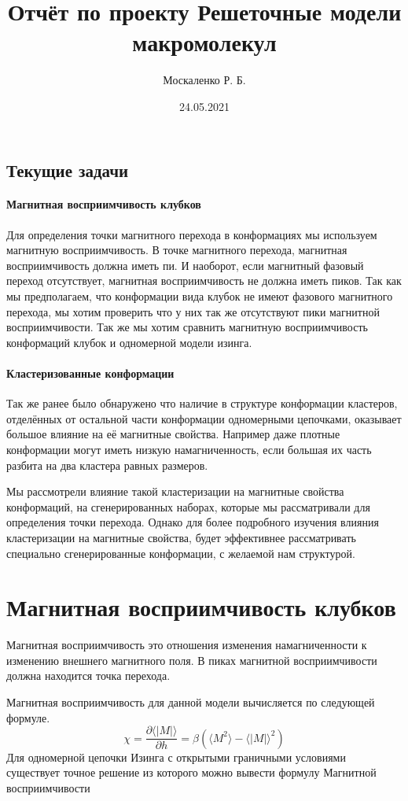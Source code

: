 \documentclass[14pt]{extarticle}
\title{Отчёт по проекту Решеточные модели макромолекул}
\author{Москаленко Р. Б.}
\date{24.05.2021}
\begin{document}




% 
\subsection{Текущие задачи}
\paragraph{Магнитная восприимчивость клубков}
Для определения точки магнитного перехода в конформациях мы используем магнитную восприимчивость. В точке магнитного перехода, магнитная восприимчивость должна иметь пи. И наоборот, если магнитный фазовый переход отсутствует, магнитная восприимчивость не должна иметь пиков. Так как мы предполагаем, что конформации вида клубок не имеют фазового магнитного перехода, мы хотим проверить что у них так же отсутствуют пики магнитной восприимчивости. Так же мы хотим сравнить магнитную восприимчивость конформаций клубок и одномерной модели изинга. 

\paragraph{Кластеризованные конформации}
Так же ранее было обнаружено что наличие в структуре конформации кластеров, отделённых от остальной части конформации одномерными цепочками, оказывает большое влияние на её магнитные свойства. Например даже плотные конформации могут иметь низкую намагниченность, если большая их часть разбита на два кластера равных размеров.

Мы рассмотрели влияние такой кластеризации на магнитные свойства конформаций, на сгенерированных наборах, которые мы рассматривали для определения точки перехода. Однако для более подробного изучения влияния кластеризации на магнитные свойства, будет эффективнее рассматривать специально сгенерированные конформации, с желаемой нам структурой.

\section{Магнитная восприимчивость клубков}
Магнитная восприимчивость это отношения изменения намагниченности к изменению внешнего магнитного поля. В пиках магнитной восприимчивости должна находится точка перехода.

Магнитная восприимчивость для данной модели вычисляется по следующей формуле.
\[
	\chi = \frac{\partial\langle |M|\rangle}{\partial h} = \beta \left(\langle M^2\rangle - \langle |M| \rangle^2 \right)
\]
Для одномерной цепочки Изинга с открытыми граничными условиями существует точное решение из которого можно вывести формулу Магнитной восприимчивости
\end{document}

